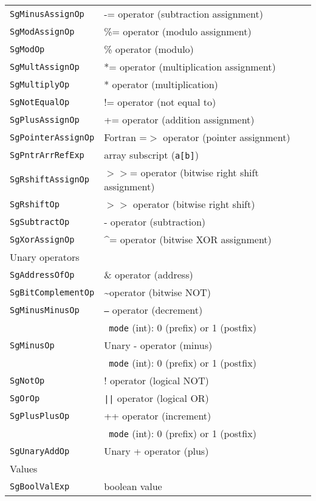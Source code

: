 \begin{longtable}[l]{l|p{10cm}}
 \texttt{SgMinusAssignOp} & -= operator (subtraction assignment) \\
 \texttt{SgModAssignOp} & \%= operator (modulo assignment)\\
 \texttt{SgModOp} & \% operator (modulo) \\
 \texttt{SgMultAssignOp} & *= operator (multiplication assignment)\\
 \texttt{SgMultiplyOp} & * operator (multiplication)\\
 \texttt{SgNotEqualOp} & != operator (not equal to)\\
 \texttt{SgPlusAssignOp} & += operator (addition assignment)\\
 \texttt{SgPointerAssignOp} & Fortran =$>$ operator (pointer assignment) \\
 \texttt{SgPntrArrRefExp} & array subscript (\texttt{a[b]})\\
 \texttt{SgRshiftAssignOp} & $>>$= operator (bitwise right shift assignment)\\
 \texttt{SgRshiftOp} & $>>$ operator (bitwise right shift)\\
 \texttt{SgSubtractOp} & - operator (subtraction)\\
 \texttt{SgXorAssignOp} & \^{}= operator (bitwise XOR assignment)\\
 \hline
 \multicolumn{2}{l}{Unary operators}\\
 \hline
 \texttt{SgAddressOfOp} & \& operator (address)\\
 \texttt{SgBitComplementOp} & \textasciitilde operator (bitwise NOT)\\
 \texttt{SgMinusMinusOp} & \texttt{--} operator (decrement)\\
 & ~\texttt{mode} (int): 0 (prefix) or 1 (postfix)\\
 \texttt{SgMinusOp} & Unary - operator (minus)\\
 & ~\texttt{mode} (int): 0 (prefix) or 1 (postfix)\\
 \texttt{SgNotOp} & ! operator (logical NOT)\\
 \texttt{SgOrOp} & \texttt{||} operator (logical OR)\\
 \texttt{SgPlusPlusOp} & ++ operator (increment)\\
 & ~\texttt{mode} (int): 0 (prefix) or 1 (postfix)\\
 \texttt{SgUnaryAddOp} & Unary + operator (plus)\\    
 \hline
 \multicolumn{2}{l}{Values}\\
 \hline
 \texttt{SgBoolValExp}& boolean value \\

\end{longtable}
